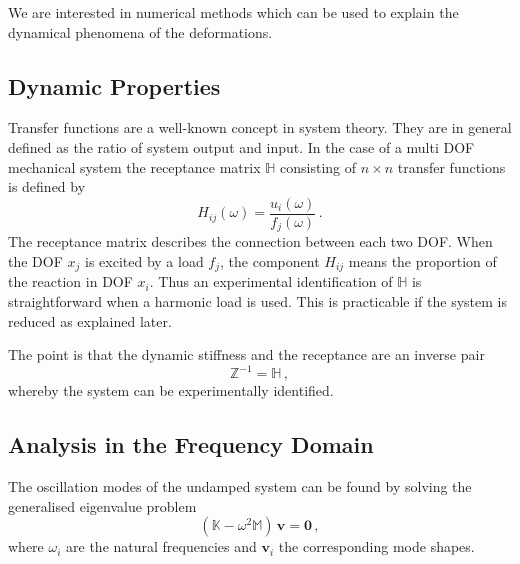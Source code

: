 \documentclass[conference]{journal}
\newcommand{\bb}[1]{\mathbb{#1}}
\newcommand{\B}[1]{\mathbf{#1}}
\newcommand{\M}{\bb{M}}
\newcommand{\K}{\bb{K}}
\begin{document}


	We are interested in numerical methods which can be used to explain the dynamical phenomena of the deformations. 

	\subsection{Dynamic Properties}
	Transfer functions are a well-known concept in system theory. They are in general defined as the ratio of system output and input. In the case of a multi DOF mechanical system the receptance matrix $\bb{H}$ consisting of $n \times n$ transfer functions is defined by
	\begin{equation}
	H_{ij}(\omega) = \frac{u_i(\omega)}{f_j(\omega)}\,.
	\end{equation}
	The receptance matrix describes the connection between each two DOF. When the DOF $x_j$ is excited by a load $f_j$, the component $H_{ij}$ means the proportion of the reaction in DOF $x_i$. Thus an experimental identification of $\bb{H}$ is straightforward when a harmonic load is used. This is practicable if the system is reduced as explained later.

	The point is that the dynamic stiffness and the receptance are an inverse pair
	\begin{equation}
	\bb{Z}^{-1} = \bb{H}\,,
	\end{equation}
	whereby the system can be experimentally identified.

	\subsection{Analysis in the Frequency Domain}
	The oscillation modes of the undamped system can be found by solving the generalised eigenvalue problem
	\begin{equation}
	\left( \K - \omega^2\M \right)\,\B{v} = \B{0}\,,
	\end{equation}
	where $\omega_i$ are the natural frequencies and $\B{v}_i$ the corresponding mode shapes.
\end{document}
